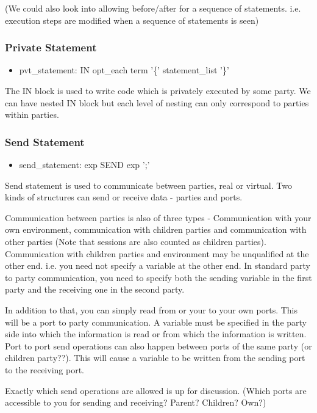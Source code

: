 \documentclass{article}
\begin{document}
(We could also look into allowing before/after for a sequence of statements. i.e. execution steps are modified when a sequence of statements is seen)

\subsubsection{Private Statement}
\begin{itemize}
\item pvt\_statement: IN opt\_each term '\{' statement\_list '\}'
\end{itemize}

The IN block is used to write code which is privately executed by some party. We can have nested IN block but each level of nesting can only correspond to parties within parties.

\subsubsection{Send Statement}
\begin{itemize}
\item send\_statement: exp SEND exp ';'
\end{itemize}

Send statement is used to communicate between parties, real or virtual. Two kinds of structures can send or receive data - parties and ports. 

Communication between parties is also of three types - Communication with your own environment, communication with children parties and communication with other parties (Note that sessions are also counted as children parties). Communication with children parties and environment may be unqualified at the other end. i.e. you need not specify a variable at the other end. In standard party to party communication, you need to specify both the sending variable in the first party and the receiving one in the second party.

In addition to that, you can simply read from or your to your own ports. This will be a port to party communication. A variable must be specified in the party side into which the information is read or from which the information is written. Port to port send operations can also happen between ports of the same party (or children party??). This will cause a variable to be written from the sending port to the receiving port.

Exactly which send operations are allowed is up for discussion. (Which ports are accessible to you for sending and receiving? Parent? Children? Own?)
\end{document}
